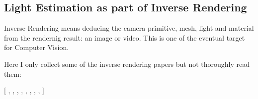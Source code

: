 
\subsection{Light Estimation as part of Inverse Rendering}

Inverse Rendering means deducing the camera primitive, mesh, light and material
from the rendernig result: an image or video.
This is one of the eventual target for Computer Vision.

Here I only collect some of the inverse rendering papers but not thoroughly read them:

[
\cite{yuInverseRenderNetLearningSingle2018},
\cite{wuUnsupervisedLearningProbably2020},
\cite{wangLearningIndoorInverse2021},
\cite{yuOutdoorInverseRendering2021},
\cite{zhangPhySGInverseRendering2021},
\cite{wimbauerDerendering3DObjects2022},
\cite{zhangModelingIndirectIllumination2022},
\cite{panGAN2XNonLambertianInverse2022},
\cite{nimier-davidUnbiasedInverseVolume2022}
]
